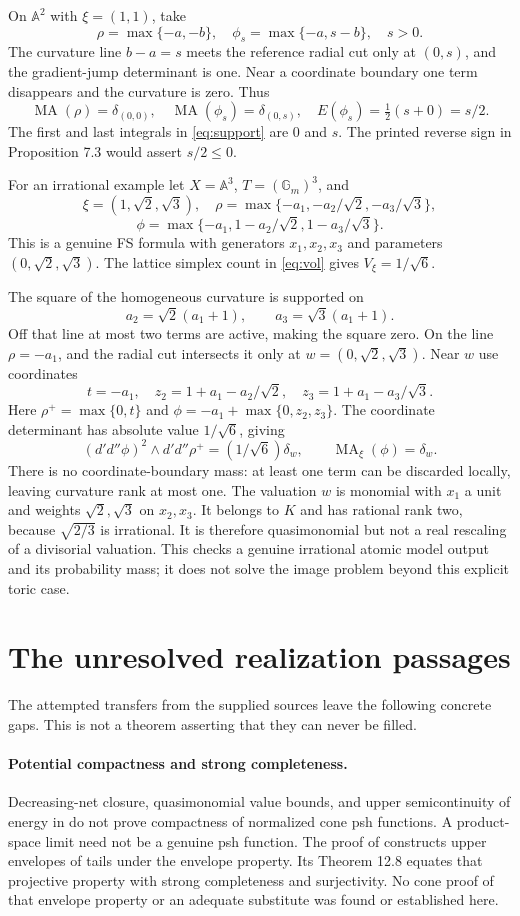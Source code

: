 \documentclass[11pt]{article}
\newcommand{\MA}{\operatorname{MA}}
\newcommand{\dd}{d'd''}
\theoremstyle{remark}
\begin{document}
On $\mathbb A^2$ with $\xi=(1,1)$, take
\[
 \rho=\max\{-a,-b\},\quad\phi_s=\max\{-a,s-b\},\quad s>0.
\]
The curvature line $b-a=s$ meets the reference radial cut only at $(0,s)$, and the gradient-jump determinant is one. Near a coordinate boundary one term disappears and the curvature is zero. Thus
\[
 \MA(\rho)=\delta_{(0,0)},\quad\MA(\phi_s)=\delta_{(0,s)},\quad
 E(\phi_s)=\tfrac12(s+0)=s/2.
\]
The first and last integrals in \eqref{eq:support} are $0$ and $s$. The printed reverse sign in Proposition 7.3 would assert $s/2\le0$.

For an irrational example let $X=\mathbb A^3$, $T=(\mathbb G_m)^3$, and
\[
 \xi=(1,\sqrt2,\sqrt3),\quad
 \rho=\max\{-a_1,-a_2/\sqrt2,-a_3/\sqrt3\},
\]
\[
 \phi=\max\{-a_1,1-a_2/\sqrt2,1-a_3/\sqrt3\}.
\]
This is a genuine FS formula with generators $x_1,x_2,x_3$ and parameters $(0,\sqrt2,\sqrt3)$. The lattice simplex count in \eqref{eq:vol} gives $V_\xi=1/\sqrt6$.

The square of the homogeneous curvature is supported on
\[
 a_2=\sqrt2(a_1+1),\qquad a_3=\sqrt3(a_1+1).
\]
Off that line at most two terms are active, making the square zero. On the line $\rho=-a_1$, and the radial cut intersects it only at $w=(0,\sqrt2,\sqrt3)$. Near $w$ use coordinates
\[
 t=-a_1,\quad z_2=1+a_1-a_2/\sqrt2,\quad z_3=1+a_1-a_3/\sqrt3.
\]
Here $\rho^+=\max\{0,t\}$ and $\phi=-a_1+\max\{0,z_2,z_3\}$. The coordinate determinant has absolute value $1/\sqrt6$, giving
\[
 (\dd\phi)^2\wedge\dd\rho^+=(1/\sqrt6)\delta_w,
 \qquad \MA_\xi(\phi)=\delta_w.
\]
There is no coordinate-boundary mass: at least one term can be discarded locally, leaving curvature rank at most one. The valuation $w$ is monomial with $x_1$ a unit and weights $\sqrt2,\sqrt3$ on $x_2,x_3$. It belongs to $K$ and has rational rank two, because $\sqrt{2/3}$ is irrational. It is therefore quasimonomial but not a real rescaling of a divisorial valuation. This checks a genuine irrational atomic model output and its probability mass; it does not solve the image problem beyond this explicit toric case.

\section{The unresolved realization passages}
The attempted transfers from the supplied sources leave the following concrete gaps. This is not a theorem asserting that they can never be filled.

\paragraph{Potential compactness and strong completeness.}
Decreasing-net closure, quasimonomial value bounds, and upper semicontinuity of energy in \cite{Wu24} do not prove compactness of normalized cone psh functions. A product-space limit need not be a genuine psh function. The proof of \cite[Theorem 5.11]{BJ22} constructs upper envelopes of tails under the envelope property. Its Theorem 12.8 equates that projective property with strong completeness and surjectivity. No cone proof of that envelope property or an adequate substitute was found or established here.
\end{document}
